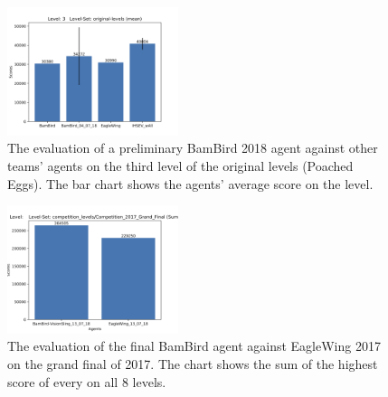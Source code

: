 \begin{figure}%
	\centering 
	\includegraphics[width=50mm]{img/evaluation_results_05_07_18_11_20_33_original_levels.png}
	\caption{The evaluation of a preliminary BamBird 2018 agent against other teams' agents on the third level of the original levels (Poached Eggs). The bar chart shows the agents' average score on the level.\label{fig:output1}}
\end{figure}

\begin{figure}%
	\centering 
	\includegraphics[width=50mm]{img/evaluation_results_13_07_18_21_17_06_grand_final_2017.png}
	\caption{The evaluation of the final BamBird agent against EagleWing 2017 on the grand final of 2017. The chart shows the sum of the highest score of every on all 8 levels.\label{fig:output2}}
\end{figure}

